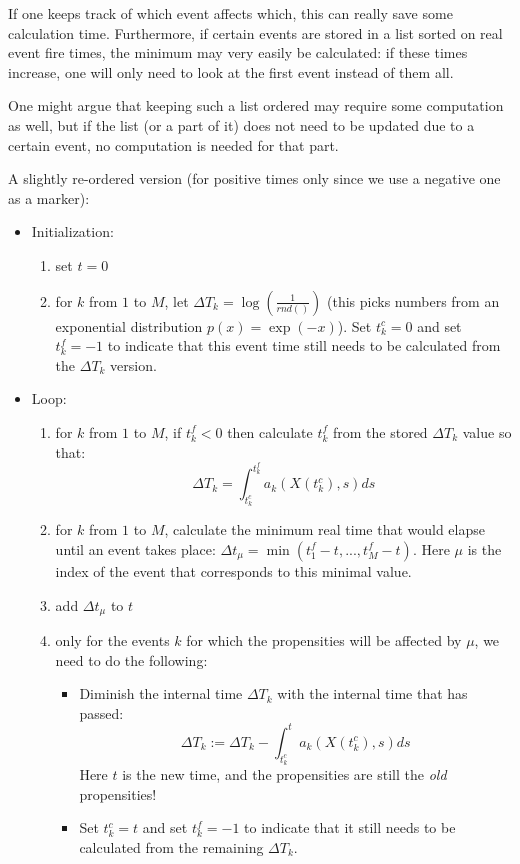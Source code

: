 \documentclass[a4paper,11pt]{article}
\begin{document}
		If one keeps track of which event affects which, this can really save some calculation time.
		Furthermore, if certain events are stored in a list sorted on real event fire times, the
		minimum may very easily be calculated: if these times increase, one will only need to look
		at the first event instead of them all.

		One might argue that keeping such a list ordered may require some computation as well, but
		if the list (or a part of it) does not need to be updated due to a certain event, no computation
		is needed for that part.

		A slightly re-ordered version (for positive times only since we use a negative one as a marker):

		\begin{itemize}
			\item Initialization: 
			\begin{enumerate}
				\item set $t = 0$
				\item for $k$ from $1$ to $M$, let $\Delta T_k = \log\left(\frac{1}{rnd()}\right)$ 
					(this picks numbers from an exponential distribution $p(x) = \exp(-x)$).
					Set $t^c_k = 0$ and set $t^f_k = -1$ to indicate that this
					event time still needs to be calculated from the $\Delta T_k$ version.

			\end{enumerate}

			\item Loop:
			\begin{enumerate}
				\item for $k$ from $1$ to $M$, if $t^f_k < 0$ then calculate $t^f_k$ from the
					stored $\Delta T_k$ value so that:
					\[\Delta T_k = \int_{t^c_k}^{t^f_k} a_k(X(t^c_k),s) ds \]

				\item for $k$ from $1$ to $M$, calculate the minimum real time that would elapse
					until an event takes place: $\Delta t_\mu = \min(t^f_1 - t, ... , t^f_M - t)$. Here $\mu$
					is the index of the event that corresponds to this minimal value.
				\item add $\Delta t_\mu$ to $t$

				\item only for the events $k$ for which the propensities will be affected by $\mu$, we need to do
					the following:
					\begin{itemize}
						\item Diminish the internal time $\Delta T_k$ with the internal time that has passed: 
							\[ \Delta T_k := \Delta T_k - \int_{t^c_k}^{t} a_k(X(t^c_k),s) ds \]
							Here $t$ is the new time, and the propensities are still the 
							{\em old} propensities!
						\item Set $t^c_k = t$ and set $t^f_k = -1$ to indicate that it still needs
							to be calculated from the remaining $\Delta T_k$.
					\end{itemize}


\end{enumerate}
\end{itemize}
\end{document}

